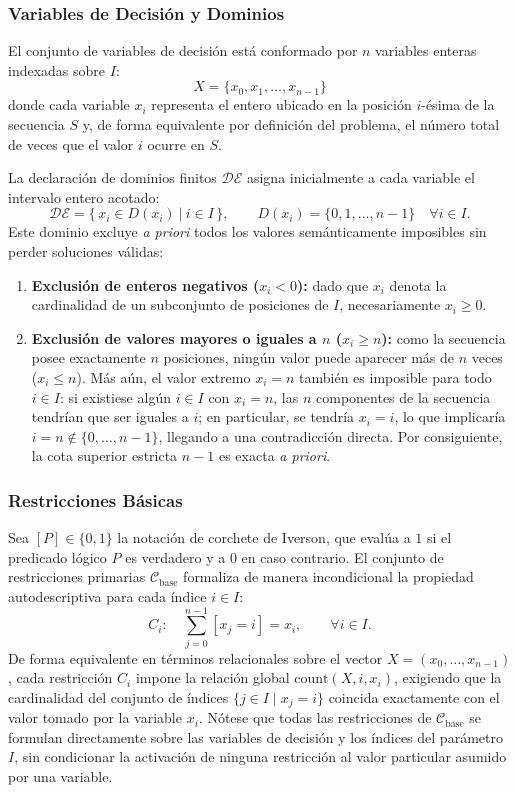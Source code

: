 \subsubsection{Variables de Decisión y Dominios}

El conjunto de variables de decisión está conformado por $n$ variables enteras indexadas sobre $I$:
\[
    X = \{x_0, x_1, \dots, x_{n-1}\}
\]
donde cada variable $x_i$ representa el entero ubicado en la posición $i$-ésima de la secuencia $S$ y, de forma equivalente por definición del problema, el número total de veces que el valor $i$ ocurre en $S$.

La declaración de dominios finitos $\mathcal{DE}$ asigna inicialmente a cada variable el intervalo entero acotado:
\[
    \mathcal{DE} = \bigl\{\, x_i \in D(x_i) \ \big|\ i \in I \,\bigr\}, \qquad D(x_i) = \{0, 1, \dots, n-1\} \quad \forall i \in I.
\]
Este dominio excluye \emph{a priori} todos los valores semánticamente imposibles sin perder soluciones válidas:
\begin{enumerate}
    \item \textbf{Exclusión de enteros negativos ($x_i < 0$):} dado que $x_i$ denota la cardinalidad de un subconjunto de posiciones de $I$, necesariamente $x_i \ge 0$.
    \item \textbf{Exclusión de valores mayores o iguales a $n$ ($x_i \ge n$):} como la secuencia posee exactamente $n$ posiciones, ningún valor puede aparecer más de $n$ veces ($x_i \le n$). Más aún, el valor extremo $x_i = n$ también es imposible para todo $i \in I$: si existiese algún $i \in I$ con $x_i = n$, las $n$ componentes de la secuencia tendrían que ser iguales a $i$; en particular, se tendría $x_i = i$, lo que implicaría $i = n \notin \{0, \dots, n-1\}$, llegando a una contradicción directa. Por consiguiente, la cota superior estricta $n-1$ es exacta \emph{a priori}.
\end{enumerate}

\subsubsection{Restricciones Básicas}

Sea $[P] \in \{0, 1\}$ la notación de corchete de Iverson, que evalúa a $1$ si el predicado lógico $P$ es verdadero y a $0$ en caso contrario. El conjunto de restricciones primarias $\mathcal{C}_{\text{base}}$ formaliza de manera incondicional la propiedad autodescriptiva para cada índice $i \in I$:
\begin{equation}
    C_i : \quad \sum_{j=0}^{n-1} [x_j = i] = x_i, \qquad \forall i \in I.
    \label{eq:sm_conteo}
\end{equation}
De forma equivalente en términos relacionales sobre el vector $X = (x_0, \dots, x_{n-1})$, cada restricción $C_i$ impone la relación global $\text{count}(X, i, x_i)$, exigiendo que la cardinalidad del conjunto de índices $\{j \in I \mid x_j = i\}$ coincida exactamente con el valor tomado por la variable $x_i$. Nótese que todas las restricciones de $\mathcal{C}_{\text{base}}$ se formulan directamente sobre las variables de decisión y los índices del parámetro $I$, sin condicionar la activación de ninguna restricción al valor particular asumido por una variable.

